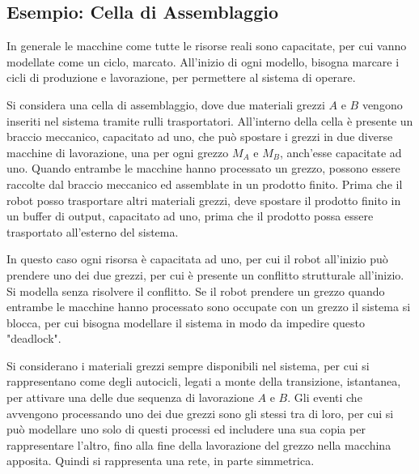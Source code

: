 \documentclass{article}
\numberwithin{equation}{subsection}
\begin{document}
\subsection{Esempio: Cella di Assemblaggio}

In generale le macchine come tutte le risorse reali sono capacitate, per cui vanno modellate come un ciclo, marcato. All'inizio di ogni modello, bisogna marcare i cicli di 
produzione e lavorazione, per permettere al sistema di operare. 

Si considera una cella di assemblaggio, dove due materiali grezzi $A$ e $B$ vengono inseriti nel sistema tramite rulli trasportatori. All'interno della cella è presente un 
braccio meccanico, capacitato ad uno, che può spostare i grezzi in due diverse macchine di lavorazione, una per ogni grezzo $M_A$ e $M_B$, anch'esse capacitate ad uno. 
Quando entrambe le macchine hanno processato un grezzo, possono essere raccolte dal braccio meccanico ed assemblate in un prodotto finito. Prima che il robot posso trasportare 
altri materiali grezzi, deve spostare il prodotto finito in un buffer di output, capacitato ad uno, prima che il prodotto possa essere trasportato all'esterno del sistema. 

In questo caso ogni risorsa è capacitata ad uno, per cui il robot all'inizio può prendere uno dei due grezzi, per cui è presente un conflitto strutturale all'inizio. Si 
modella senza risolvere il conflitto. Se il robot prendere un grezzo quando entrambe le macchine hanno processato sono occupate con un grezzo il sistema si blocca, per cui 
bisogna modellare il sistema in modo da impedire questo "deadlock". 

Si considerano i materiali grezzi sempre disponibili nel sistema, per cui si rappresentano come degli autocicli, legati a monte della transizione, istantanea, per attivare 
una delle due sequenza di lavorazione $A$ e $B$. Gli eventi che avvengono processando uno dei due grezzi sono gli stessi tra di loro, per cui si può modellare uno solo di 
questi processi ed includere una sua copia per rappresentare l'altro, fino alla fine della lavorazione del grezzo nella macchina apposita. Quindi si rappresenta una 
rete, in parte simmetrica. 
\end{document}
